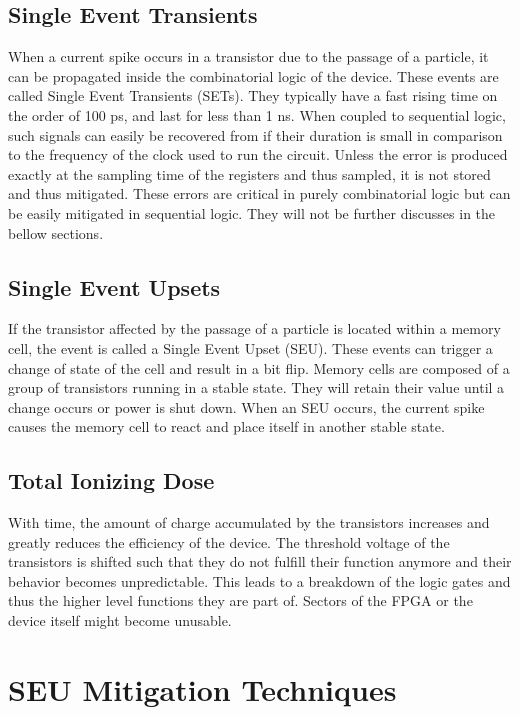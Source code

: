     \subsection{Single Event Transients}

      When a current spike occurs in a transistor due to the passage of a particle, it can be propagated inside the combinatorial logic of the device. These events are called Single Event Transients (SETs). They typically have a fast rising time on the order of 100 ps, and last for less than 1 ns. When coupled to sequential logic, such signals can easily be recovered from if their duration is small in comparison to the frequency of the clock used to run the circuit. Unless the error is produced exactly at the sampling time of the registers and thus sampled, it is not stored and thus mitigated. These errors are critical in purely combinatorial logic but can be easily mitigated in sequential logic. They will not be further discusses in the bellow sections.

    \subsection{Single Event Upsets}

      If the transistor affected by the passage of a particle is located within a memory cell, the event is called a Single Event Upset (SEU). These events can trigger a change of state of the cell and result in a bit flip. Memory cells are composed of a group of transistors running in a stable state. They will retain their value until a change occurs or power is shut down. When an SEU occurs, the current spike causes the memory cell to react and place itself in another stable state.

    \subsection{Total Ionizing Dose}

      With time, the amount of charge accumulated by the transistors increases and greatly reduces the efficiency of the device. The threshold voltage of the transistors is shifted such that they do not fulfill their function anymore and their behavior becomes unpredictable. This leads to a breakdown of the logic gates and thus the higher level functions they are part of. Sectors of the FPGA or the device itself might become unusable.

  \section{SEU Mitigation Techniques}

